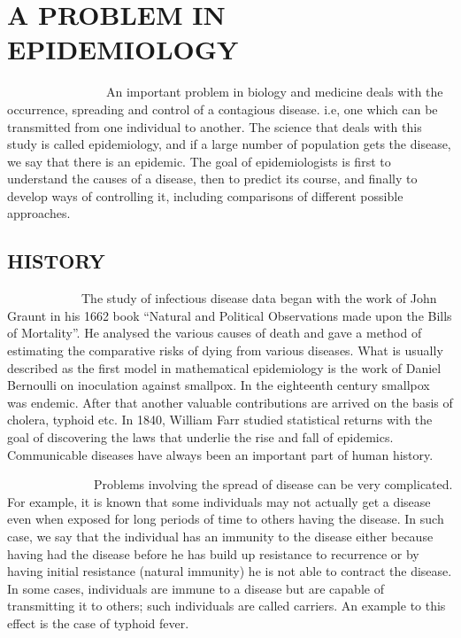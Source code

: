 \pagebreak

\section{A PROBLEM IN EPIDEMIOLOGY}




\par ~~~~~~~~~~~~~~~~An important problem in biology and medicine deals with the occurrence, spreading and control of a contagious disease. i.e, one which can be transmitted from one individual to another. The science that deals with this study is called epidemiology, and if a large number of population gets the disease, we say that there is an epidemic. The goal of epidemiologists is first to understand the causes of a disease, then to predict its course, and finally to develop ways of controlling it, including comparisons of different possible approaches.

\subsection*{HISTORY}

\par ~~~~~~~~~~~~The study of infectious disease data began with the work of John Graunt in his 1662 book “Natural and Political Observations made upon the Bills of Mortality”. He analysed the various causes of death and gave a method of estimating the comparative risks of dying from various diseases. What is usually described as the first model in mathematical epidemiology is the work of Daniel Bernoulli on inoculation against smallpox. In the eighteenth century smallpox was endemic. After that another valuable contributions are arrived on the basis of cholera, typhoid etc. In 1840, William Farr studied statistical returns with the goal of discovering the laws that underlie the rise and fall of epidemics. Communicable diseases have always been an important part of human history. 

\par ~~~~~~~~~~~~~~Problems involving the spread of disease can be very complicated. For example, it is known that some individuals may not actually get a disease even when exposed for long periods of time to others having the disease. In such case, we say that the individual has an immunity to the disease either because having had   the disease before he has build up resistance to recurrence or by having initial   resistance (natural immunity) he is not able to contract the disease. In some cases, individuals are immune to a disease but are capable of transmitting it to others; such individuals are called carriers. An example to this effect is the case of typhoid fever.      



